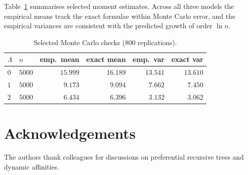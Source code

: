 \documentclass[11pt]{article}
\theoremstyle{remark}
\begin{document}
Table~\ref{tab:moments} summarises selected moment estimates. Across all three
models the empirical means track the exact formulae within Monte Carlo error, and
the empirical variances are consistent with the predicted growth of order
\(\ln n\).

\begin{table}[ht]
\centering
\caption{Selected Monte Carlo checks (\(800\) replications).}
\label{tab:moments}
\begin{tabular}{llrrrr}
\toprule
\(\Lambda\) & \(n\) & emp.\ mean & exact mean & emp.\ var & exact var \\
\midrule
\(0\) & \(5000\) & \(15.999\) & \(16.189\) & \(13.541\) & \(13.610\) \\
\(1\) & \(5000\) & \(9.173\) & \(9.094\) & \(7.662\) & \(7.450\) \\
\(2\) & \(5000\) & \(6.434\) & \(6.396\) & \(3.132\) & \(3.062\) \\
\bottomrule
\end{tabular}
\end{table}

\section*{Acknowledgements}

The authors thank colleagues for discussions on preferential recursive trees and
dynamic affinities.



\end{document}
